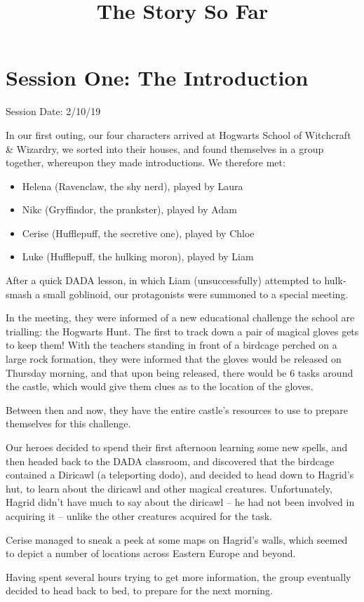 \documentclass[oneside]{book}
\begin{document}
\title{{\HP The Story So Far}}

\maketitle

\section{Session One: The Introduction}

Session Date: 2/10/19

In our first outing, our four characters arrived at Hogwarts School of Witchcraft \& Wizardry, we sorted into their houses, and found themselves in a group together, whereupon they made introductions. We therefore met:
\begin{itemize}
	\item Helena (Ravenclaw, the shy nerd), played by Laura
	\item Nikc (Gryffindor, the prankster), played by Adam
	\item Cerise (Hufflepuff, the secretive one), played by Chloe
	\item Luke (Hufflepuff, the hulking moron), played by Liam
\end{itemize}
After a quick DADA lesson, in which Liam (unsuccessfully) attempted to hulk-smash a small goblinoid, our protagonists were summoned to a special meeting. 

In the meeting, they were informed of a new educational challenge the school are trialling: the Hogwarts Hunt. The first to track down a pair of magical gloves gets to keep them! With the teachers standing in front of a birdcage perched on a large rock formation, they were informed that the gloves would be released on Thursday morning, and that upon being released, there would be 6 tasks around the castle, which would give them clues as to the location of the gloves.

Between then and now, they have the entire castle's resources to use to prepare themselves for this challenge. 

Our heroes decided to spend their first afternoon learning some new spells, and then headed back to the DADA classroom, and discovered that the birdcage contained a Diricawl (a teleporting dodo), and decided to head down to Hagrid's hut, to learn about the diricawl and other magical creatures. Unfortunately, Hagrid didn't have much to say about the diricawl -- he had not been involved in acquiring it -- unlike the other creatures acquired for the task. 

Cerise managed to sneak a peek at some maps on Hagrid's walls, which seemed to depict a number of locations across Eastern Europe and beyond. 

Having spent several hours trying to get more information, the group eventually decided to head back to bed, to prepare for the next morning. 
\end{document}
